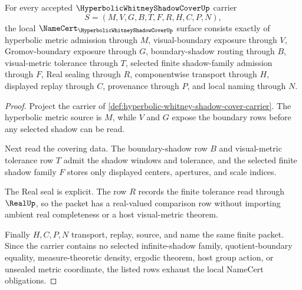 \begin{theorem}
\label{thm:hyperbolic-whitney-shadow-cover-namecert-obligations}
For every accepted $\HyperbolicWhitneyShadowCoverUp$ carrier
$$
S=(M,V,G,B,T,F,R,H,C,P,N),
$$
the local $\NameCert_{\HyperbolicWhitneyShadowCoverUp}$ surface consists exactly of hyperbolic metric admission through $M$, visual-boundary exposure through $V$, Gromov-boundary exposure through $G$, boundary-shadow routing through $B$, visual-metric tolerance through $T$, selected finite shadow-family admission through $F$, Real sealing through $R$, componentwise transport through $H$, displayed replay through $C$, provenance through $P$, and local naming through $N$.
\end{theorem}
\begin{proof}
Project the carrier of \autoref{def:hyperbolic-whitney-shadow-cover-carrier}. The hyperbolic metric source is $M$, while $V$ and $G$ expose the boundary rows before any selected shadow can be read.

Next read the covering data. The boundary-shadow row $B$ and visual-metric tolerance row $T$ admit the shadow windows and tolerance, and the selected finite shadow family $F$ stores only displayed centers, apertures, and scale indices.

The Real seal is explicit. The row $R$ records the finite tolerance read through $\RealUp$, so the packet has a real-valued comparison row without importing ambient real completeness or a host visual-metric theorem.

Finally $H,C,P,N$ transport, replay, source, and name the same finite packet. Since the carrier contains no selected infinite-shadow family, quotient-boundary equality, measure-theoretic density, ergodic theorem, host group action, or unsealed metric coordinate, the listed rows exhaust the local NameCert obligations.
\end{proof}



